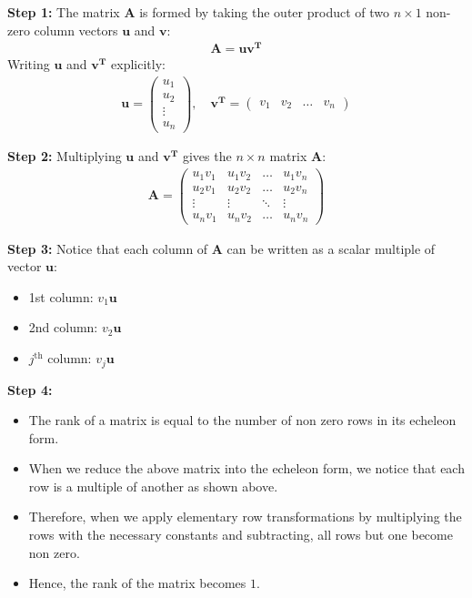 \documentclass[journal,12pt,onecolumn]{IEEEtran}
\newcommand{\myvec}[1]{\begin{pmatrix}#1\end{pmatrix}}
\theoremstyle{remark}
\begin{document}
    \noindent \textbf{Step 1:}
    The matrix $\mathbf{A}$ is formed by taking the outer product of two $n \times 1$ non-zero column vectors $\mathbf{u}$ and $\mathbf{v}$:
    \begin{align}
    \mathbf{A = uv^T}
    \end{align}
    Writing $\mathbf{u}$ and $\mathbf{v^T}$ explicitly:
    \begin{align}
    \mathbf{u}= \myvec{ u_1 \\ u_2 \\ \vdots \\ u_n }, \quad
    \mathbf{v^T} = \myvec{ v_1 & v_2 & \dots & v_n }
    \end{align}

    \noindent \textbf{Step 2:}
    Multiplying $\mathbf{u}$ and $\mathbf{v^T}$ gives the $n \times n$ matrix $\mathbf{A}$:
    \begin{align}
    \mathbf{A} = \myvec{ 
    u_1 v_1 & u_1 v_2 & \dots & u_1 v_n \\ 
    u_2 v_1 & u_2 v_2 & \dots & u_2 v_n \\ 
    \vdots & \vdots & \ddots & \vdots \\ 
    u_n v_1 & u_n v_2 & \dots & u_n v_n 
    }
    \end{align}

    \noindent \textbf{Step 3:}
    Notice that each column of $\mathbf{A}$ can be written as a scalar multiple of vector $\mathbf{u}$:
    \begin{itemize}
        \item 1st column: $v_1 \mathbf{u}$
        \item 2nd column: $v_2 \mathbf{u}$
        \item $j^{\text{th}}$ column: $v_j \mathbf{u}$
    \end{itemize}
    

    \noindent \textbf{Step 4:}
    \begin{itemize}
        \item The rank of a matrix is equal to the number of non zero rows in its echeleon form.
        \item When we reduce the above matrix into the echeleon form, we notice that each row is a multiple of another as shown above.
        \item Therefore, when we apply elementary row transformations by multiplying the rows with the necessary constants and subtracting, all rows but one become non zero.
        \item Hence, the rank of the matrix becomes $1$.
    \end{itemize}
\end{document}
